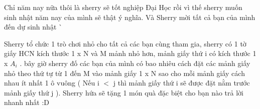 Chỉ năm nay nữa thôi là sherry sẽ tốt nghiệp Đại Học rồi vì thế sherry muốn sinh nhật năm nay của mình sẽ thật ý nghĩa. Và Sherry mời tất cả bạn của mình đến dự sinh nhật ^^  

   Sherry tổ chức 1 trò chơi nhỏ cho tất cả các bạn cùng tham gia, sherry có 1 tờ giấy HCN kích thước 1 x N và M mảnh nhỏ hơn, mảnh giấy thứ i có kích thước 1 x $A_{i}$   . bây giờ sherry đố các bạn của mình có bao nhiêu cách đặt các mảnh giấy nhỏ theo thứ tự từ 1 đến M  vào mảnh giấy 1 x N sao cho mỗi mảnh giấy cách nhau ít nhất 1 ô vuông ( Nếu i $<$ j thì mảnh giấy thứ i sẽ được đặt nằm trước mảnh giấy thứ j ). Sherry hứa sẽ tặng 1 món quà đặc biệt cho bạn nào trả lời nhanh nhất :D